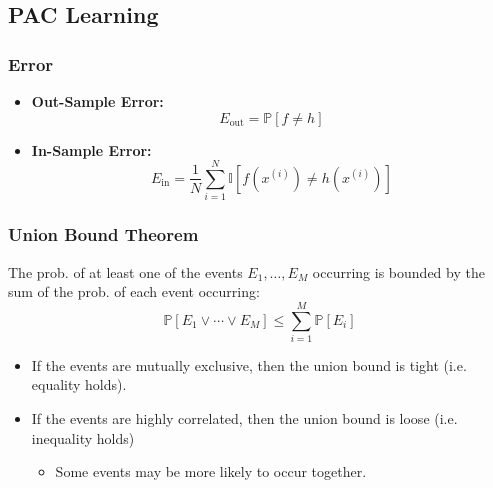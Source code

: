 \subsection{PAC Learning}
\subsubsection{Error}
\begin{definition}
    \begin{itemize}
        \item \textbf{Out-Sample Error:}
        \begin{equation*}
            E_{\text{out}} = \mathbb{P}[f \neq h]
        \end{equation*}
        \item \textbf{In-Sample Error:}
        \begin{equation*}
            E_{\text{in}} = \frac{1}{N} \sum_{i=1}^{N} \mathbb{I}[f(x^{(i)}) \neq h(x^{(i)})]
        \end{equation*}
    \end{itemize}
\end{definition}

\subsubsection{Union Bound Theorem}
\begin{theorem}
    The prob. of at least one of the events $E_1, \ldots, E_M$ occurring is bounded by the sum of the prob. of each event occurring:
    \begin{equation*}
        \mathbb{P} \left[E_1 \lor \cdots \lor E_M \right] \leq \sum_{i=1}^{M} \mathbb{P}[E_i]
    \end{equation*}
\end{theorem}

\begin{notes}
    \begin{itemize}
        \item If the events are mutually exclusive, then the union bound is tight (i.e. equality holds).
        \item If the events are highly correlated, then the union bound is loose (i.e. inequality holds)
        \begin{itemize}
            \item Some events may be more likely to occur together.
        \end{itemize}
    \end{itemize}
\end{notes}
\newpage

